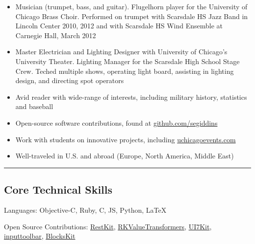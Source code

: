 \documentclass[10pt,letterpaper]{article}
\newcommand{\ahref}[1]
{\href{http://#1}{#1}}
\newcommand{\github}[2]
{\href{https://github.com/#1/#2}{#2}}
\begin{document}
\begin{itemize}[noitemsep, leftmargin=*]
    \item Musician (trumpet, bass, and guitar). Flugelhorn player for the University of Chicago Brass Choir. Performed on trumpet with Scarsdale HS Jazz Band in Lincoln Center 2010, 2012 and with Scarsdale HS Wind Ensemble at Carnegie Hall, March 2012
    \item Master Electrician and Lighting Designer with University of Chicago’s University Theater. Lighting Manager for the Scarsdale High School Stage Crew. Teched multiple shows, operating light board, assisting in lighting design, and directing spot operators
    \item Avid reader with wide-range of interests, including military history, statistics and baseball
    \item Open-source software contributions, found at \ahref{github.com/segiddins}
    \item Work with students on innovative projects, including \ahref{uchicagoevents.com}
    \item Well-traveled in U.S. and abroad (Europe, North America, Middle East)
\end{itemize}


\hrule
\vspace{-0.4em}
\subsection*{Core Technical Skills}

\begin{description*}
	\item[Languages:]
	    Objective-C,
	    Ruby,
	    C,
	    JS,
	    Python, 
	    \LaTeX
	\item[Open Source Contributions:]
	    \github{RestKit}{RestKit},
	    \github{RestKit}{RKValueTransformers},
	    \github{youknowone}{UI7Kit},
	    \github{brandonhamilton}{inputtoolbar},
	    \github{pandamonia}{BlocksKit}
\end{description*}
\end{document}
